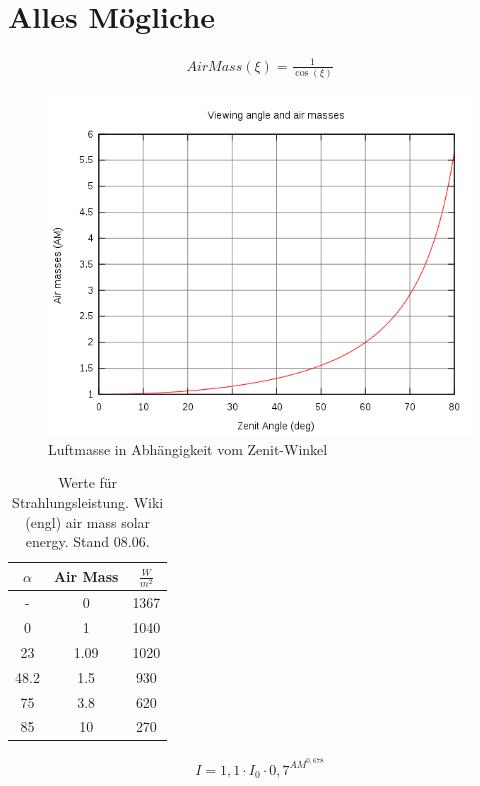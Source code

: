 \documentclass[fontsize=10pt,paper=a4,bibliography=totoc]{scrartcl}
\begin{document}
\section{Alles Mögliche}

\begin{align*}
	AirMass(\xi)=\frac{1}{\cos(\xi)}
\end{align*}

\begin{figure}
	\centering
	\includegraphics{images/Airmass.png}
	\caption{Luftmasse in Abhängigkeit vom Zenit-Winkel}
	\label{pic:AirMass}
\end{figure}

\begin{table}
\centering
	\caption{Werte für Strahlungsleistung. Wiki (engl) air mass solar energy. Stand 08.06.}
	\label{tab:airmass}
\begin{tabular}{|c|c|c|}
	\hline
	$\alpha$ & Air Mass & $\frac{W}{m^2}$\\
	\hline
	- & 0 & 1367\\
	\hline
	0 & 1 & 1040\\
	\hline
	23 & 1.09 & 1020\\
	\hline
	48.2 & 1.5 & 930\\
	\hline
	75 & 3.8 & 620\\
	\hline
	85 & 10 & 270\\
	\hline
\end{tabular}
\end{table}

\begin{align*}
	I=1,1\cdot I_0 \cdot 0,7^{AM^{0,678}}
	\label{eqn:Intensity}
\end{align*}
\end{document}
